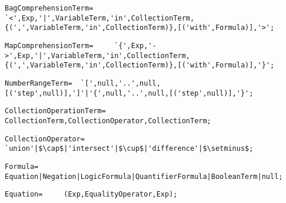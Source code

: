 \documentclass{article}
\begin{document}
    \begin{flushleft}
    \begin{lstlisting}[mathescape=true, breaklines=true]
      BagComprehensionTerm= 	`<',Exp,'|',VariableTerm,'in',CollectionTerm,{(',',VariableTerm,'in',CollectionTerm)},[('with',Formula)],'>';
    \end{lstlisting}
    \end{flushleft}
    \begin{flushleft}
    \begin{lstlisting}[mathescape=true, breaklines=true]
      MapComprehensionTerm= 	`{',Exp,'->',Exp,'|',VariableTerm,'in',CollectionTerm,{(',',VariableTerm,'in',CollectionTerm)},[('with',Formula)],'}';
    \end{lstlisting}
    \end{flushleft}
    \begin{flushleft}
    \begin{lstlisting}[mathescape=true, breaklines=true]
      NumberRangeTerm= 	`[',null,'..',null,[('step',null)],']'|'{',null,'..',null,[('step',null)],'}';
    \end{lstlisting}
    \end{flushleft}
    \begin{flushleft}
    \begin{lstlisting}[mathescape=true, breaklines=true]
      CollectionOperationTerm= 	CollectionTerm,CollectionOperator,CollectionTerm;
    \end{lstlisting}
    \end{flushleft}
    \begin{flushleft}
    \begin{lstlisting}[mathescape=true, breaklines=true]
      CollectionOperator= 	`union'|$\cap$|'intersect'|$\cup$|'difference'|$\setminus$;
    \end{lstlisting}
    \end{flushleft}
    \begin{flushleft}
    \begin{lstlisting}[mathescape=true, breaklines=true]
      Formula= 	Equation|Negation|LogicFormula|QuantifierFormula|BooleanTerm|null;
    \end{lstlisting}
    \end{flushleft}
    \begin{flushleft}
    \begin{lstlisting}[mathescape=true, breaklines=true]
      Equation= 	(Exp,EqualityOperator,Exp);
    \end{lstlisting}
    \end{flushleft}
\end{document}
